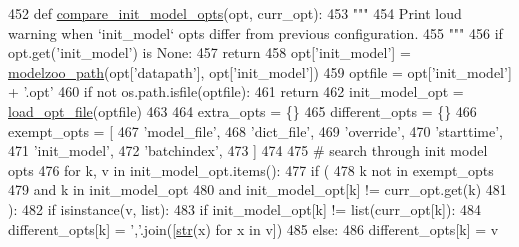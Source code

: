 \begin{DoxyCode}
452 \textcolor{keyword}{def }\hyperlink{namespaceparlai_1_1core_1_1agents_a7eb0ec391b94a2adc51acdf8d2a35a68}{compare\_init\_model\_opts}(opt, curr\_opt):
453     \textcolor{stringliteral}{"""}
454 \textcolor{stringliteral}{    Print loud warning when `init\_model` opts differ from previous configuration.}
455 \textcolor{stringliteral}{    """}
456     \textcolor{keywordflow}{if} opt.get(\textcolor{stringliteral}{'init\_model'}) \textcolor{keywordflow}{is} \textcolor{keywordtype}{None}:
457         \textcolor{keywordflow}{return}
458     opt[\textcolor{stringliteral}{'init\_model'}] = \hyperlink{namespaceparlai_1_1agents_1_1legacy__agents_1_1seq2seq_1_1utils__v0_a5fbd3301b67f00d6d146fb01c7cd7626}{modelzoo\_path}(opt[\textcolor{stringliteral}{'datapath'}], opt[\textcolor{stringliteral}{'init\_model'}])
459     optfile = opt[\textcolor{stringliteral}{'init\_model'}] + \textcolor{stringliteral}{'.opt'}
460     \textcolor{keywordflow}{if} \textcolor{keywordflow}{not} os.path.isfile(optfile):
461         \textcolor{keywordflow}{return}
462     init\_model\_opt = \hyperlink{namespaceparlai_1_1utils_1_1misc_a7c97ef3250327bc549ac652a481be0cf}{load\_opt\_file}(optfile)
463 
464     extra\_opts = \{\}
465     different\_opts = \{\}
466     exempt\_opts = [
467         \textcolor{stringliteral}{'model\_file'},
468         \textcolor{stringliteral}{'dict\_file'},
469         \textcolor{stringliteral}{'override'},
470         \textcolor{stringliteral}{'starttime'},
471         \textcolor{stringliteral}{'init\_model'},
472         \textcolor{stringliteral}{'batchindex'},
473     ]
474 
475     \textcolor{comment}{# search through init model opts}
476     \textcolor{keywordflow}{for} k, v \textcolor{keywordflow}{in} init\_model\_opt.items():
477         \textcolor{keywordflow}{if} (
478             k \textcolor{keywordflow}{not} \textcolor{keywordflow}{in} exempt\_opts
479             \textcolor{keywordflow}{and} k \textcolor{keywordflow}{in} init\_model\_opt
480             \textcolor{keywordflow}{and} init\_model\_opt[k] != curr\_opt.get(k)
481         ):
482             \textcolor{keywordflow}{if} isinstance(v, list):
483                 \textcolor{keywordflow}{if} init\_model\_opt[k] != list(curr\_opt[k]):
484                     different\_opts[k] = \textcolor{stringliteral}{','}.join([\hyperlink{namespacegenerate__task__READMEs_a5b88452ffb87b78c8c85ececebafc09f}{str}(x) \textcolor{keywordflow}{for} x \textcolor{keywordflow}{in} v])
485             \textcolor{keywordflow}{else}:
486                 different\_opts[k] = v

\end{DoxyCode}

